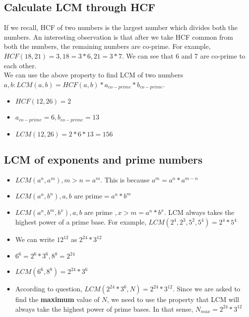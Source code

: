 \subsection{Calculate LCM through HCF}
If we recall, HCF of two numbers is the largest number which divides both the numbers. An interesting observation is that after we take HCF common from both the numbers, the remaining numbers are co-prime. For example, $HCF(18,21) = 3, 18 = 3 * 6, 21 = 3 * 7.$ We can see that 6 and 7 are co-prime to each other. \\

We can use the above property to find LCM of two numbers $a,b : LCM(a,b) = HCF(a,b) * a_{co-prime} * b_{co-prime}$.

\begin{itemize}
    \item $HCF(12,26) = 2$
    \item $a_{co-prime} = 6, b_{co-prime} = 13$
    \item $LCM(12,26) = 2 * 6 * 13 = 156$
\end{itemize}

\subsection{LCM of exponents and prime numbers}
\begin{itemize}
    \item $LCM(a^n,a^m), m > n = a^m$. This is because $a^m = a^n * a^{m-n}$
    \item $LCM(a^n,b^n), a,b \text{ are prime} = a^n * b^m$
    \item $LCM(a^n, b^m, b^x), a,b \text{ are prime }, x > m = a^n * b^x$. LCM always takes the highest power of a prime base. For example, $LCM(2^4,2^3,5^2,5^4) = 2^4 * 5^4$
\end{itemize}

\begin{itemize}
    \item We can write $12^{12}$ as $2^{24} * 3^{12}$
    \item $6^6 = 2^6 * 3^6, 8^8 = 2^{24}$
    \item $LCM(6^6,8^8) = 2^{24} * 3^6$
    \item According to question, $LCM(2^{24} * 3^6,N) = 2^{24} * 3^{12}$. Since we are asked to find the \textbf{maximum} value of $N$, we need to use the property that LCM will always take the highest power of prime bases. In that sense, $N_{max} = 2^{24} * 3^{12}$
\end{itemize}

